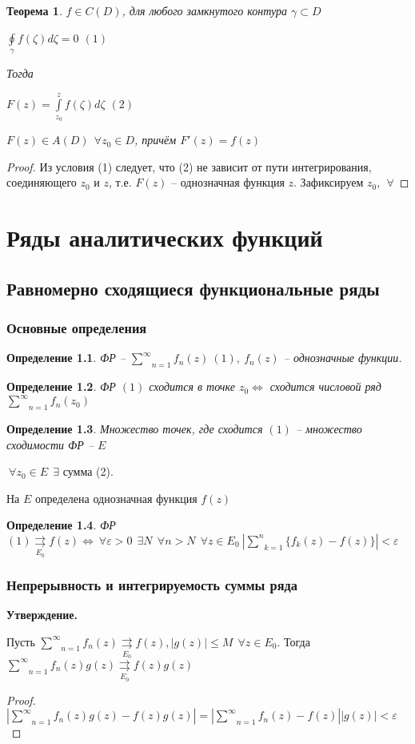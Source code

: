 \documentclass[draft]{report}
\newcommand{\rra}{\rightrightarrows}
\newcommand{\rrae}[1]{\underset{#1}{\rightrightarrows}}
\newcommand{\mint}[2]{\underset{#1}{\overset{#2}{\int}}}
\newcommand{\moint}[1]{\underset{#1}{\oint}}
\newcommand{\msum}[2]{\underset{#1}{\overset{#2}{\sum}}}
\newcommand{\LRA}{\Leftrightarrow}
\newcommand{\g}{\gamma}
\newcommand{\e}{\varepsilon}
\newcommand{\E}{\ \exists}
\newcommand{\F}{\ \forall}
\newcommand{\opr}[1]{\begin{opred}#1\end{opred}}
\newtheorem*{theor}{Теорема}
\newtheorem*{opred}{Определение}
\theoremstyle{remark}
\begin{document}
\begin{theor}
$f\in C(D)$, для любого замкнутого контура $\g\subset D$

$\moint{\g}f(\zeta)d\zeta=0$ $(1)$

Тогда

$F(z)=\mint{z_0}{z}f(\zeta)d\zeta$ $(2)$

$F(z)\in A(D)\ \F z_0\in D$, причём $F'(z)=f(z)$
\end{theor}
\begin{proof}
Из условия (1) следует, что (2) не зависит от пути интегрирования, соединяющего $z_0$ и $z$, т.е. $F(z)$ -- однозначная функция $z$.
Зафиксируем $z_0,\ \F$
\end{proof}

\chapter{Ряды аналитических функций}

\section{Равномерно сходящиеся функциональные ряды}

\subsection{Основные определения}

\opr{ФР -- $\msum{n=1}{\infty}f_n(z)\ (1),\ f_n(z)$ -- однозначные функции.}

\opr{ФР $(1)$ сходится в точке $z_0\LRA$ сходится числовой ряд $\msum{n=1}{\infty}f_n(z_0)$}

\opr{Множество точек, где сходится $(1)$ -- множество сходимости ФР -- $E$}

$\F z_0\in E\ \E$ сумма (2).

На $E$ определена однозначная функция $f(z)$

\opr{ФР $(1)\underset{E_0}{\rra}f(z)\LRA \F \e>0\ \E N\ \F n>N\ \F z\in E_0\ \left|\msum{k=1}{n}\{f_k(z)-f(z)\}\right|<\e$}

\subsection{Непрерывность и интегрируемость суммы ряда}

{\bfseries Утверждение.}

Пусть $\msum{n=1}{\infty}f_n(z)\rrae{E_0}f(z), |g(z)|\leq M\ \F z\in E_0$. Тогда $\msum{n=1}{\infty}f_n(z)g(z)\rrae{E_0}f(z)g(z)$
\begin{proof}
$|\msum{n=1}{\infty}f_n(z)g(z)-f(z)g(z)|=|\msum{n=1}{\infty}f_n(z)-f(z)||g(z)|<\e$
\end{proof}
\end{document}
